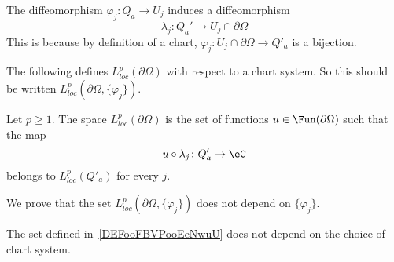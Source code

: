 The diffeomorphism \( \varphi_j\colon Q_a\to U_j\) induces a diffeomorphism
\begin{equation}
	\lambda_j\colon Q_a'\to U_j\cap\partial \Omega
\end{equation}
This is because by definition of a chart, \( \varphi_j\colon U_j\cap\partial\Omega\to Q'_a\) is a bijection.

The following defines \( L^p_{loc}(\partial\Omega)\) with respect to a chart system. So this should be written \( L^p_{loc}(\partial\Omega,\{ \varphi_j \})\).
\begin{definition}      \label{DEFooFBVPooEeNwuU}
	Let \( p\geq 1\). The space \( L^p_{loc}(\partial \Omega)\) is the set of functions \( u\in\Fun(\partial\Omega)\) such that the map
	\begin{equation}
		u\circ\lambda_j\colon Q'_a\to \eC
	\end{equation}
	belongs to \( L^p_{loc}(Q'_a)\) for every \( j\).
\end{definition}

We prove that the set \( L^p_{loc}(\partial\Omega,\{ \varphi_j \})\) does not depend on \( \{ \varphi_j \}\).
\begin{lemma}
	The set defined in~\ref{DEFooFBVPooEeNwuU} does not depend on the choice of chart system.
\end{lemma}

